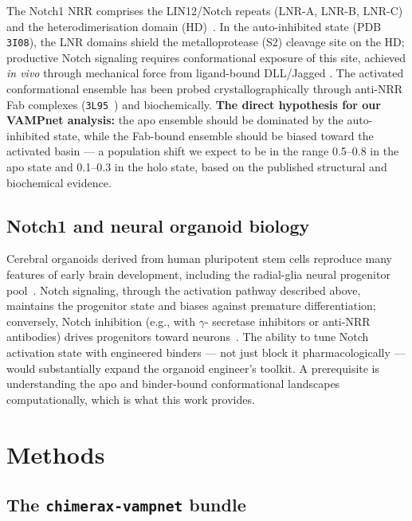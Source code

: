 \documentclass[11pt]{article}
\begin{document}
The Notch1 NRR comprises the LIN12/Notch repeats (LNR-A, LNR-B, LNR-C)
and the heterodimerisation domain (HD)~\cite{gordon2007nrr}. In the
auto-inhibited state (PDB \texttt{3I08}), the LNR domains shield the
metalloprotease (S2) cleavage site on the HD; productive Notch signaling
requires conformational exposure of this site, achieved \emph{in vivo}
through mechanical force from ligand-bound DLL/Jagged
\cite{tiyanont2011exposure}. The activated conformational ensemble has
been probed crystallographically through anti-NRR Fab complexes
(\texttt{3L95}~\cite{wu2010antinrr}) and biochemically. \textbf{The
direct hypothesis for our VAMPnet analysis:} the apo ensemble should be
dominated by the auto-inhibited state, while the Fab-bound ensemble
should be biased toward the activated basin --- a population shift we
expect to be in the range 0.5--0.8 in the apo state and 0.1--0.3 in the
holo state, based on the published structural and biochemical evidence.

\subsection{Notch1 and neural organoid biology}

Cerebral organoids derived from human pluripotent stem cells reproduce
many features of early brain development, including the radial-glia
neural progenitor pool~\cite{lancaster2013organoids,pasca2018rise}.
Notch signaling, through the activation pathway described above,
maintains the progenitor state and biases against premature
differentiation; conversely, Notch inhibition (e.g., with $\gamma$-
secretase inhibitors or anti-NRR antibodies) drives progenitors toward
neurons~\cite{imayoshi2014bhlh}. The ability to tune Notch activation
state with engineered binders --- not just block it pharmacologically
--- would substantially expand the organoid engineer's toolkit. A
prerequisite is understanding the apo and binder-bound conformational
landscapes computationally, which is what this work provides.

\section{Methods}
\label{sec:methods}

\subsection{The \texttt{chimerax-vampnet} bundle}
\end{document}
